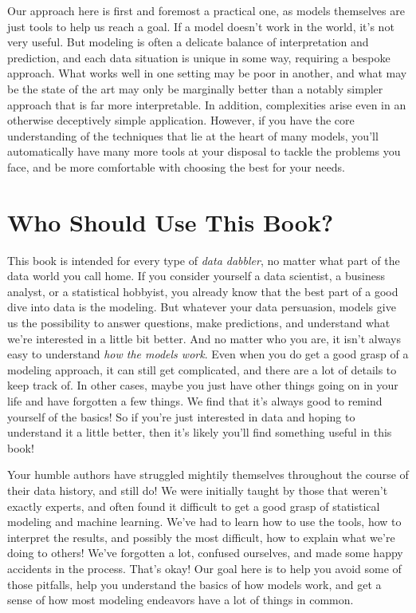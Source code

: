 \documentclass[
  letterpaper,
]{krantz}
\begin{document}
Our approach here is first and foremost a practical one, as models
themselves are just tools to help us reach a goal. If a model doesn't
work in the world, it's not very useful. But modeling is often a
delicate balance of interpretation and prediction, and each data
situation is unique in some way, requiring a bespoke approach. What
works well in one setting may be poor in another, and what may be the
state of the art may only be marginally better than a notably simpler
approach that is far more interpretable. In addition, complexities arise
even in an otherwise deceptively simple application. However, if you
have the core understanding of the techniques that lie at the heart of
many models, you'll automatically have many more tools at your disposal
to tackle the problems you face, and be more comfortable with choosing
the best for your needs.

\section{Who Should Use This Book?}\label{who-should-use-this-book}

This book is intended for every type of \emph{data dabbler}, no matter
what part of the data world you call home. If you consider yourself a
data scientist, a business analyst, or a statistical hobbyist, you
already know that the best part of a good dive into data is the
modeling. But whatever your data persuasion, models give us the
possibility to answer questions, make predictions, and understand what
we're interested in a little bit better. And no matter who you are, it
isn't always easy to understand \emph{how the models work}. Even when
you do get a good grasp of a modeling approach, it can still get
complicated, and there are a lot of details to keep track of. In other
cases, maybe you just have other things going on in your life and have
forgotten a few things. We find that it's always good to remind yourself
of the basics! So if you're just interested in data and hoping to
understand it a little better, then it's likely you'll find something
useful in this book!

Your humble authors have struggled mightily themselves throughout the
course of their data history, and still do! We were initially taught by
those that weren't exactly experts, and often found it difficult to get
a good grasp of statistical modeling and machine learning. We've had to
learn how to use the tools, how to interpret the results, and possibly
the most difficult, how to explain what we're doing to others! We've
forgotten a lot, confused ourselves, and made some happy accidents in
the process. That's okay! Our goal here is to help you avoid some of
those pitfalls, help you understand the basics of how models work, and
get a sense of how most modeling endeavors have a lot of things in
common.
\end{document}
